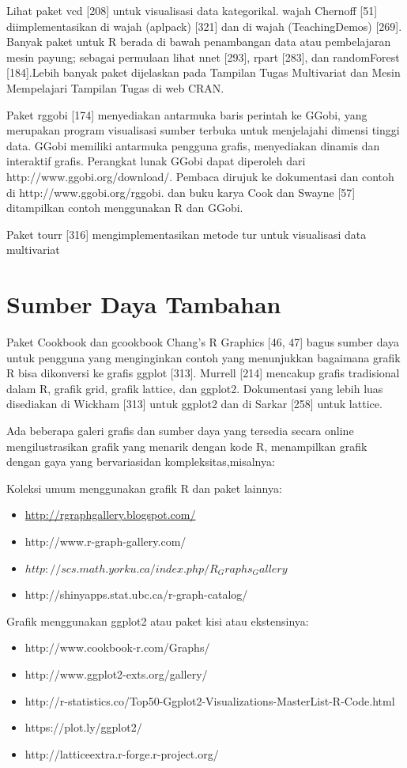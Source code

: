 \documentclass[a4paper,12pt]{article}
\theoremstyle{definition}
\begin{document}
Lihat paket vcd [208] untuk visualisasi data kategorikal. wajah Chernoff [51] diimplementasikan di wajah (aplpack) [321] dan di wajah (TeachingDemos) [269]. Banyak paket untuk R berada di bawah penambangan data atau pembelajaran mesin payung; sebagai permulaan lihat nnet [293], rpart [283], dan randomForest [184].Lebih banyak paket dijelaskan pada Tampilan Tugas Multivariat dan Mesin Mempelajari Tampilan Tugas di web CRAN.

 Paket rggobi [174] menyediakan antarmuka baris perintah ke GGobi, yang merupakan program visualisasi sumber terbuka untuk menjelajahi dimensi tinggi data. GGobi memiliki antarmuka pengguna grafis, menyediakan dinamis dan interaktif grafis. Perangkat lunak GGobi dapat diperoleh dari http://www.ggobi.org/download/.  Pembaca dirujuk ke dokumentasi dan contoh di http://www.ggobi.org/rggobi. dan buku karya Cook dan Swayne [57] ditampilkan contoh menggunakan R dan GGobi.

 Paket tourr [316] mengimplementasikan metode tur untuk visualisasi data multivariat


\section{Sumber Daya Tambahan}

Paket Cookbook dan gcookbook Chang's R Graphics [46, 47] bagus sumber daya untuk pengguna yang menginginkan contoh yang menunjukkan bagaimana grafik R bisa dikonversi ke grafis ggplot [313]. Murrell [214] mencakup grafis tradisional dalam R, grafik grid, grafik lattice, dan ggplot2. Dokumentasi yang lebih luas disediakan di Wickham [313] untuk ggplot2 dan di Sarkar [258] untuk lattice.

Ada beberapa galeri grafis dan sumber daya yang tersedia secara online mengilustrasikan grafik yang menarik dengan kode R, menampilkan grafik dengan gaya yang bervariasidan kompleksitas,misalnya:

Koleksi umum menggunakan grafik R dan paket lainnya:
\begin{itemize}
\item \url{http://rgraphgallery.blogspot.com/}
\item http://www.r-graph-gallery.com/
\item $http://scs.math.yorku.ca/index.php/R_Graphs_Gallery$
\item http://shinyapps.stat.ubc.ca/r-graph-catalog/
\end{itemize}

Grafik menggunakan ggplot2 atau paket kisi atau ekstensinya:

\begin{itemize}
\item http://www.cookbook-r.com/Graphs/
\item http://www.ggplot2-exts.org/gallery/
\item http://r-statistics.co/Top50-Ggplot2-Visualizations-MasterList-R-Code.html
\item https://plot.ly/ggplot2/
\item http://latticeextra.r-forge.r-project.org/
\end{itemize}

\newpage
\printbibliography[heading=bibintoc,title={Daftar Pustaka}]
\end{document}
